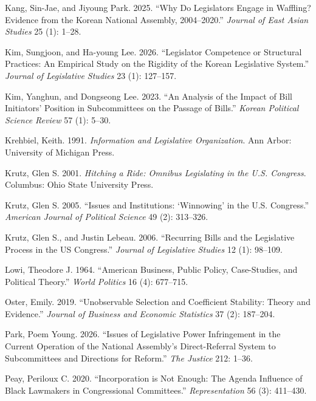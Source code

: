 \documentclass[11pt]{article}
\begin{document}
\begin{description}
\item Kang, Sin-Jae, and Jiyoung Park. 2025. ``Why Do Legislators Engage in Waffling? Evidence from the Korean National Assembly, 2004--2020.'' \textit{Journal of East Asian Studies} 25 (1): 1--28.

\item Kim, Sungjoon, and Ha-young Lee. 2026. ``Legislator Competence or Structural Practices: An Empirical Study on the Rigidity of the Korean Legislative System.'' \textit{Journal of Legislative Studies} 23 (1): 127--157.

\item Kim, Yanghun, and Dongseong Lee. 2023. ``An Analysis of the Impact of Bill Initiators' Position in Subcommittees on the Passage of Bills.'' \textit{Korean Political Science Review} 57 (1): 5--30.

\item Krehbiel, Keith. 1991. \textit{Information and Legislative Organization}. Ann Arbor: University of Michigan Press.

\item Krutz, Glen S. 2001. \textit{Hitching a Ride: Omnibus Legislating in the U.S. Congress}. Columbus: Ohio State University Press.

\item Krutz, Glen S. 2005. ``Issues and Institutions: `Winnowing' in the U.S. Congress.'' \textit{American Journal of Political Science} 49 (2): 313--326.

\item Krutz, Glen S., and Justin Lebeau. 2006. ``Recurring Bills and the Legislative Process in the US Congress.'' \textit{Journal of Legislative Studies} 12 (1): 98--109.

\item Lowi, Theodore J. 1964. ``American Business, Public Policy, Case-Studies, and Political Theory.'' \textit{World Politics} 16 (4): 677--715.

\item Oster, Emily. 2019. ``Unobservable Selection and Coefficient Stability: Theory and Evidence.'' \textit{Journal of Business and Economic Statistics} 37 (2): 187--204.

\item Park, Poem Young. 2026. ``Issues of Legislative Power Infringement in the Current Operation of the National Assembly's Direct-Referral System to Subcommittees and Directions for Reform.'' \textit{The Justice} 212: 1--36.

\item Peay, Periloux C. 2020. ``Incorporation is Not Enough: The Agenda Influence of Black Lawmakers in Congressional Committees.'' \textit{Representation} 56 (3): 411--430.


\end{description}
\end{document}
